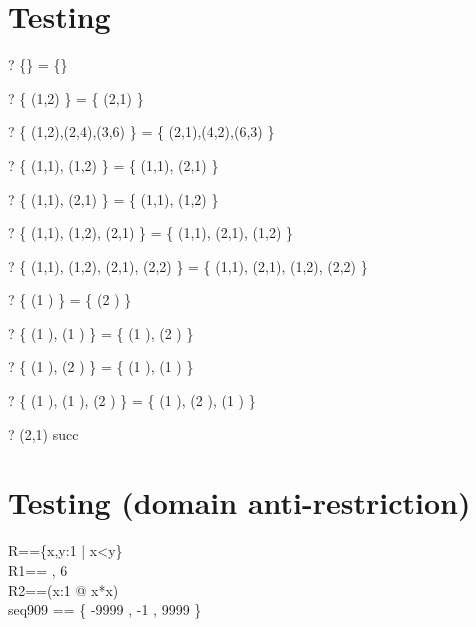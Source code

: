 \documentclass{article}
\newcommand{\negate}{-}
\begin{document}
\section{Testing \inv}
\begin{zed} \vdash? \{\} \inv = \{\} \end{zed}
\begin{zed} \vdash? \{ (1,2) \} \inv = \{ (2,1) \} \end{zed}
\begin{zed} \vdash? \{ (1,2),(2,4),(3,6) \} \inv = \{ (2,1),(4,2),(6,3) \} \end{zed}
\begin{zed} \vdash? \{ (1,1), (1,2) \} \inv = \{ (1,1), (2,1) \} \end{zed}
\begin{zed} \vdash? \{ (1,1), (2,1) \} \inv = \{ (1,1), (1,2) \} \end{zed}
\begin{zed} \vdash? \{ (1,1), (1,2), (2,1) \} \inv = \{ (1,1), (2,1), (1,2) \} \end{zed}
\begin{zed} \vdash? \{ (1,1), (1,2), (2,1), (2,2) \} \inv = \{ (1,1), (2,1), (1,2), (2,2) \} \end{zed}
\begin{zed} \vdash? \{ (1 ) \} \inv = \{ (2 ) \} \end{zed}
\begin{zed} \vdash? \{ (1 ), (1 ) \} \inv = \{ (1 ), (2 ) \} \end{zed}
\begin{zed} \vdash? \{ (1 ), (2 ) \} \inv = \{ (1 ), (1 ) \} \end{zed}
\begin{zed} \vdash? \{ (1 ), (1 ), (2 ) \} \inv = \{ (1 ), (2 ), (1 ) \} \end{zed}
\begin{zed} \vdash? (2,1) \in succ\inv \end{zed}

\section{Testing \ndres (domain anti-restriction)}
\begin{zed}
  R==\{x,y:1  | x<y\} \\
  R1== , 6  \rangle\\
  R2==(\lambda x:1  @ x*x)\\
  seq909 == \{ \negate 9999 , \negate 1 , 9999 \mapsto \negate 9999 \}
\end{zed}
\end{document}
